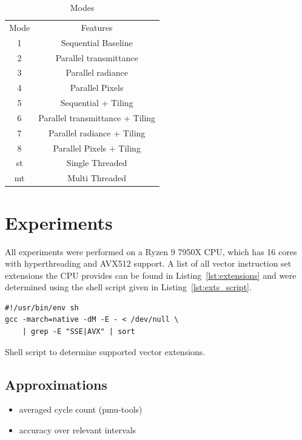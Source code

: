 \documentclass[a4paper, 11pt]{memoir}
\begin{document}
    \begin{table}[b]
        \centering
        \begin{tabular}{|c|c|}
            \hline
            Mode & Features\\
            1    & Sequential Baseline\\
            2    & Parallel \gls{transmittance}\\
            3    & Parallel \gls{radiance}\\
            4    & Parallel Pixels\\
            5    & Sequential + Tiling\\
            6    & Parallel \gls{transmittance} + Tiling\\
            7    & Parallel \gls{radiance} + Tiling\\
            8    & Parallel Pixels + Tiling\\
            st   & Single Threaded\\
            mt   & Multi Threaded\\
            \hline
        \end{tabular}
        \caption{Modes}
        \label{tab:exec_modes}
    \end{table}
    
    \chapter{Experiments}
    \label{ch:experiments}
    
    All experiments were performed on a Ryzen 9 7950X CPU, which has 16 cores with hyperthreading and AVX512 support.
    A list of all vector instruction set extensions the CPU provides can be found in Listing~\ref{lst:extensions} and
    were determined using the shell script given in Listing~\ref{lst:exts_script}.
    \begin{listing}[H]
        \begin{verbatim}
#!/usr/bin/env sh
gcc -march=native -dM -E - < /dev/null \
    | grep -E "SSE|AVX" | sort
        \end{verbatim}
        \caption{Shell script to determine supported vector extensions.}
        \label{lst:exts_script}
    \end{listing}

    \section{Approximations}
    \begin{itemize}
        \item averaged cycle count (pmu-tools)
        \item accuracy over relevant intervals
    \end{itemize}
\end{document}
